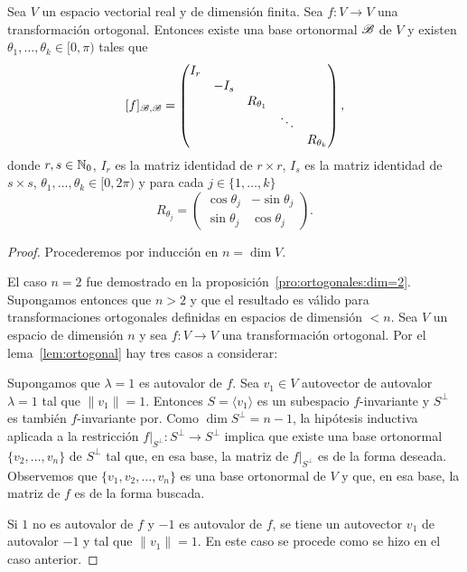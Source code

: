 \begin{thm}
    Sea $V$ un espacio vectorial real y de dimensión finita. Sea $f\colon V\to V$
    una transformación ortogonal. Entonces 
       existe una base ortonormal $\mathscr{B}$ de $V$ y 
    existen $\theta_1,\dots,\theta_k\in[0,\pi)$ tales que 
    \[
    [f]_{\mathscr{B},\mathscr{B}}=\begin{pmatrix}
        I_r\\
        &-I_s\\
        &&R_{\theta_1}\\
        &&&\ddots\\
        &&&&R_{\theta_k}
    \end{pmatrix},
    \]
    donde $r,s\in\mathbb{N}_0$, $I_r$ es la matriz identidad de $r\times r$, $I_s$ es
    la matriz identidad de $s\times s$, $\theta_1,\dots,\theta_k\in[0,2\pi)$ y
    para cada $j\in\{1,\dots,k\}$ 
    \[
    R_{\theta_j}=
    \begin{pmatrix}
        \cos\theta_j & -\sin\theta_j\\
        \sin\theta_j & \cos\theta_j
    \end{pmatrix}.
    \]

    \begin{proof}
        Procederemos por inducción en $n=\dim V$.

        El caso $n=2$ fue demostrado en la
        proposición~\ref{pro:ortogonales:dim=2}. Supongamos entonces que $n>2$
        y que el resultado es válido para transformaciones ortogonales
        definidas en espacios de dimensión $<n$. Sea $V$ un espacio de
        dimensión $n$ y sea $f\colon V\to V$ una transformación ortogonal.  Por
        el lema~\ref{lem:ortogonal} hay tres casos a considerar:

        Supongamos que $\lambda=1$ es autovalor de $f$. Sea $v_1\in V$
        autovector de autovalor $\lambda=1$ tal que $\|v_1\|=1$. Entonces
        $S=\langle v_1\rangle$ es un subespacio $f$-invariante y $S^\perp$ es
        también $f$-invariante por. Como $\dim S^\perp=n-1$, la hipótesis
        inductiva aplicada a la restricción $f|_{S^\perp}\colon S^\perp\to
        S^\perp$ implica que existe una base ortonormal $\{v_2,\dots,v_n\}$ de
        $S^\perp$ tal que, en esa base, la matriz de $f|_{S^\perp}$ es de la
        forma deseada.  Observemos que $\{v_1,v_2,\dots,v_n\}$ es una base
        ortonormal de $V$ y que, en esa base, la matriz de $f$ es de la forma
        buscada.
        
        Si $1$ no es autovalor de $f$ y $-1$ es autovalor de $f$, se tiene un
        autovector $v_1$ de autovalor $-1$ y tal que $\|v_1\|=1$. En este caso
        se procede como se hizo en el caso anterior. 


\end{proof}
\end{thm}
